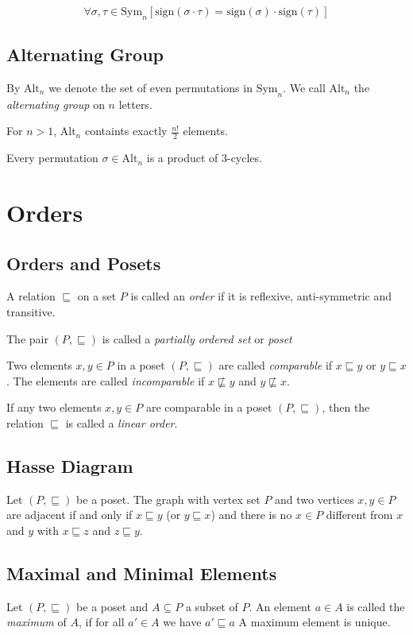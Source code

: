 \documentclass[fleqn]{article}
\begin{document}
\begin{equation*}
    \forall \sigma,\tau \in \text{Sym}_n \left[ \text{sign}(\sigma \cdot \tau) = \text{sign}(\sigma) \cdot \text{sign}(\tau)  \right]
\end{equation*}

\subsection{Alternating Group}
By $\text{Alt}_n$ we denote the set of even permutations in $\text{Sym}_n$.
We call $\text{Alt}_n$ the \textit{alternating group} on $n$ letters.

For $n>1$, $\text{Alt}_n$ containts exactly $\frac{n!}{2}$ elements.

Every permutation $\sigma \in \text{Alt}_n$ is a product of 3-cycles.

\section{Orders}
\subsection{Orders and Posets}
A relation $\sqsubseteq$ on a set $P$ is called an \textit{order} if it is
reflexive, anti-symmetric and transitive.

The pair $(P,\sqsubseteq)$ is called a \textit{partially ordered set} or \textit{poset}

Two elements $x,y \in P$ in a poset $(P,\sqsubseteq)$ are called \textit{comparable}
if $x \sqsubseteq y$ or $y \sqsubseteq x$. The elements are called \textit{incomparable}
if $x \not\sqsubseteq y$ and $y \not\sqsubseteq x$.

If any two elements $x,y \in P$ are comparable in a poset $(P, \sqsubseteq)$, then
the relation $\sqsubseteq$ is called a \textit{linear order}.

\subsection{Hasse Diagram}
Let $(P, \sqsubseteq)$ be a poset. The graph with vertex set $P$ and two vertices
$x,y \in P$ are adjacent if and only if $x \sqsubseteq y$ (or $y \sqsubseteq x$)
and there is no $x \in P$ different from $x$ and $y$ with $x \sqsubseteq z$ and $z \sqsubseteq y$.

\subsection{Maximal and Minimal Elements}
Let $(P, \sqsubseteq)$ be a poset and $A \subseteq P$ a subset of $P$. An element
$a \in A$ is called the \textit{maximum} of $A$, if for all $a' \in A$ we have $a' \sqsubseteq a$
A maximum element is unique.
\end{document}
